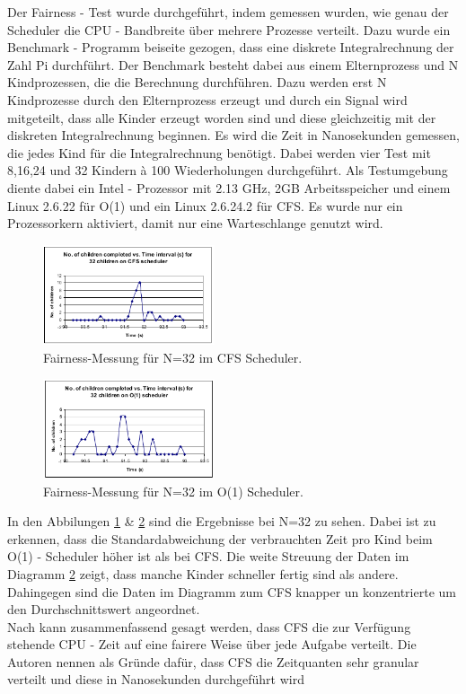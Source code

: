 Der Fairness - Test wurde durchgeführt, indem gemessen wurden, wie genau der Scheduler die CPU - Bandbreite über mehrere Prozesse verteilt. Dazu wurde ein Benchmark - Programm beiseite gezogen, dass eine diskrete Integralrechnung der Zahl Pi durchführt. Der Benchmark besteht dabei aus einem Elternprozess und N Kindprozessen, die die Berechnung durchführen. Dazu werden erst N Kindprozesse durch den Elternprozess erzeugt und durch ein Signal wird mitgeteilt, dass alle Kinder erzeugt worden sind und diese gleichzeitig mit der diskreten Integralrechnung beginnen. Es wird die Zeit in Nanosekunden gemessen, die jedes Kind für die Integralrechnung benötigt. Dabei werden vier Test mit 8,16,24 und 32 Kindern à 100 Wiederholungen durchgeführt. Als Testumgebung diente dabei ein Intel - Prozessor mit 2.13 GHz, 2GB Arbeitsspeicher und einem Linux 2.6.22 für O(1) und ein Linux 2.6.24.2 für CFS. Es wurde nur ein Prozessorkern aktiviert, damit nur eine Warteschlange genutzt wird.  
\begin{figure} [h]
	\centering
	\includegraphics[width=0.45\textwidth]{pictures/fairness_32_cfs.png}
	\caption{Fairness-Messung für N=32 im CFS Scheduler.}
	\label{fig:fair_meas_cfs}
\end{figure}
\begin{figure} [h]
 	\centering
 	\includegraphics[width=0.45\textwidth]{pictures/fairness_32_O1.png}
 	\caption{Fairness-Messung für N=32 im O(1) Scheduler.}
 	\label{fig:fair_meas_o1}
\end{figure}

In den Abbilungen \ref{fig:fair_meas_cfs} \& \ref{fig:fair_meas_o1} sind die Ergebnisse bei N=32 zu sehen. Dabei ist zu erkennen, dass die Standardabweichung der verbrauchten Zeit pro Kind beim O(1) - Scheduler höher ist als bei CFS. Die weite Streuung der Daten im Diagramm \ref{fig:fair_meas_o1} zeigt, dass manche Kinder schneller fertig sind als andere. Dahingegen sind die Daten im Diagramm zum CFS knapper un konzentrierte um den Durchschnittswert angeordnet. \\
Nach \cite{papercomparison} kann zusammenfassend gesagt werden, dass CFS die zur Verfügung stehende CPU - Zeit auf eine fairere Weise über jede Aufgabe verteilt. Die Autoren nennen als Gründe dafür, dass CFS die Zeitquanten sehr granular verteilt und diese in Nanosekunden durchgeführt wird

